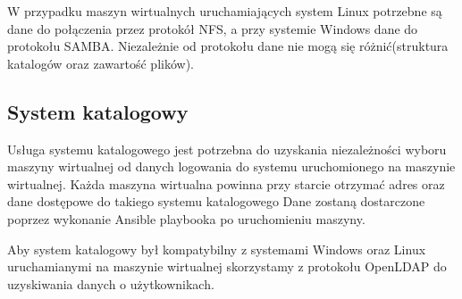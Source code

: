 \documentclass[../deliverable-two.tex]{subfiles}
\begin{document}
W przypadku maszyn wirtualnych uruchamiających system Linux potrzebne są dane do połączenia przez protokół NFS, a przy systemie Windows dane do protokołu SAMBA.
Niezależnie od protokołu dane nie mogą się różnić(struktura katalogów oraz zawartość plików).

\subsection{System katalogowy}
Usługa systemu katalogowego jest potrzebna do uzyskania niezależności wyboru maszyny wirtualnej od danych logowania do systemu uruchomionego na maszynie wirtualnej.
Każda maszyna wirtualna powinna przy starcie otrzymać adres oraz dane dostępowe do takiego systemu katalogowego
Dane zostaną dostarczone poprzez wykonanie Ansible playbooka po uruchomieniu maszyny.

Aby system katalogowy był kompatybilny z systemami Windows oraz Linux uruchamianymi na maszynie wirtualnej skorzystamy z protokołu OpenLDAP do uzyskiwania danych o użytkownikach.
\end{document}
